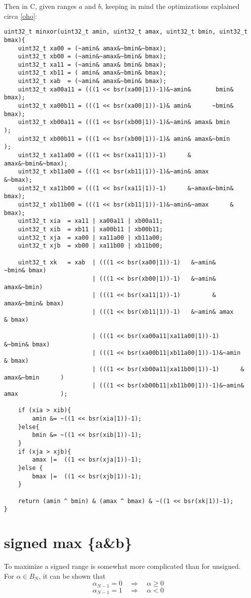 \documentclass{article}
\begin{document}
Then in C, given ranges $a$ and $b$,
keeping in mind the optimizations explained circa \ref{oho}:
\begin{lstlisting}
uint32_t minxor(uint32_t amin, uint32_t amax, uint32_t bmin, uint32_t bmax){
    uint32_t xa00 = (~amin& amax&~bmin&~bmax);
    uint32_t xb00 = (~amin&~amax&~bmin& bmax);
    uint32_t xa11 = (~amin& amax& bmin& bmax);
    uint32_t xb11 = ( amin& amax&~bmin& bmax);
    uint32_t xab  = (~amin& amax&~bmin& bmax);
    uint32_t xa00a11 = (((1 << bsr(xa00|1))-1)&~amin&       bmin& bmax);
    uint32_t xa00b11 = (((1 << bsr(xa00|1))-1)& amin&      ~bmin& bmax);
    uint32_t xb00a11 = (((1 << bsr(xb00|1))-1)&~amin& amax& bmin      );
    uint32_t xb00b11 = (((1 << bsr(xb00|1))-1)& amin& amax&~bmin      );
    uint32_t xa11a00 = (((1 << bsr(xa11|1))-1)      & amax&~bmin&~bmax);
    uint32_t xb11a00 = (((1 << bsr(xb11|1))-1)&~amin& amax      &~bmax);
    uint32_t xa11b00 = (((1 << bsr(xa11|1))-1)      &~amax&~bmin& bmax);
    uint32_t xb11b00 = (((1 << bsr(xb11|1))-1)&~amin&~amax      & bmax);
    uint32_t xia  = xa11 | xa00a11 | xb00a11;
    uint32_t xib  = xb11 | xa00b11 | xb00b11;
    uint32_t xja  = xa00 | xa11a00 | xb11a00; 
    uint32_t xjb  = xb00 | xa11b00 | xb11b00;

    uint32_t xk   = xab  | (((1 << bsr(xa00|1))-1)   &~amin&      ~bmin& bmax)
                         | (((1 << bsr(xb00|1))-1)   &~amin& amax&~bmin)
                         | (((1 << bsr(xa11|1))-1)         & amax&~bmin& bmax)
                         | (((1 << bsr(xb11|1))-1)   &~amin& amax      & bmax)

                         | (((1 << bsr(xa00a11|xa11a00|1))-1)            &~bmin& bmax)
                         | (((1 << bsr(xa00b11|xb11a00|1))-1)&~amin            & bmax)
                         | (((1 << bsr(xb00a11|xa11b00|1))-1)      & amax&~bmin      )
                         | (((1 << bsr(xb00b11|xb11b00|1))-1)&~amin& amax            );
                     
    if (xia > xib){
        amin &= ~((1 << bsr(xia|1))-1);
    }else{
        bmin &= ~((1 << bsr(xib|1))-1);
    }
    if (xja > xjb){
        amax |=  ((1 << bsr(xja|1))-1);
    }else {
        bmax |=  ((1 << bsr(xjb|1))-1);
    }

    return (amin ^ bmin) & (amax ^ bmax) & ~((1 << bsr(xk|1))-1);
}
\end{lstlisting}

\section{signed max \{a\&b\}}
To maximize a signed range is somewhat more 
complicated than for unsigned. For $\alpha \in B_N$, it can be shown that
\begin{equation}\label{g0}
\alpha_{N-1} = 0 \quad \Rightarrow \quad \alpha \ge 0
\end{equation}
\begin{equation}\label{l0}
\alpha_{N-1} = 1 \quad \Rightarrow \quad \alpha < 0
\end{equation}
\end{document}
